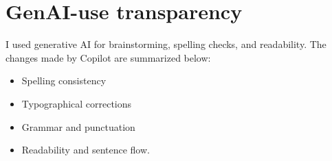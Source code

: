 \documentclass[12pt]{article}
\begin{document}
\section{GenAI-use transparency}
I used generative AI for brainstorming, spelling checks, and readability. The changes made by Copilot are summarized below:
\begin{itemize}
    \item Spelling consistency
    \item Typographical corrections
    \item Grammar and punctuation
    \item Readability and sentence flow.
\end{itemize}
\printbibliography
\end{document}
